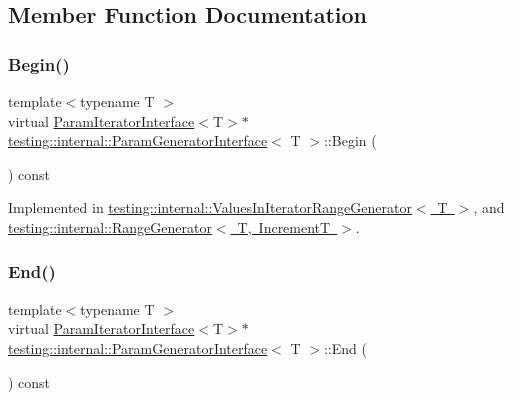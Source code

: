 \subsection{Member Function Documentation}
\mbox{\label{classtesting_1_1internal_1_1ParamGeneratorInterface_ae1de83b16fe9a53c67778a026c6a9569}} 
\subsubsection{\texorpdfstring{Begin()}{Begin()}}
{\footnotesize\ttfamily template$<$typename T $>$ \\
virtual \mbox{\hyperlink{classtesting_1_1internal_1_1ParamIteratorInterface}{Param\+Iterator\+Interface}}$<$T$>$$\ast$ \mbox{\hyperlink{classtesting_1_1internal_1_1ParamGeneratorInterface}{testing\+::internal\+::\+Param\+Generator\+Interface}}$<$ T $>$\+::Begin (\begin{DoxyParamCaption}{ }\end{DoxyParamCaption}) const\hspace{0.3cm}{\ttfamily [pure virtual]}}



Implemented in \mbox{\hyperlink{classtesting_1_1internal_1_1ValuesInIteratorRangeGenerator_a91dac42f069cd06d05348fe5dd78639b}{testing\+::internal\+::\+Values\+In\+Iterator\+Range\+Generator$<$ T $>$}}, and \mbox{\hyperlink{classtesting_1_1internal_1_1RangeGenerator_ae68b59f9348ecf93e0947545a2424765}{testing\+::internal\+::\+Range\+Generator$<$ T, Increment\+T $>$}}.

\mbox{\label{classtesting_1_1internal_1_1ParamGeneratorInterface_afa7211b74990e11d3fc7ad4e7113da4f}} 
\subsubsection{\texorpdfstring{End()}{End()}}
{\footnotesize\ttfamily template$<$typename T $>$ \\
virtual \mbox{\hyperlink{classtesting_1_1internal_1_1ParamIteratorInterface}{Param\+Iterator\+Interface}}$<$T$>$$\ast$ \mbox{\hyperlink{classtesting_1_1internal_1_1ParamGeneratorInterface}{testing\+::internal\+::\+Param\+Generator\+Interface}}$<$ T $>$\+::End (\begin{DoxyParamCaption}{ }\end{DoxyParamCaption}) const\hspace{0.3cm}{\ttfamily [pure virtual]}}



